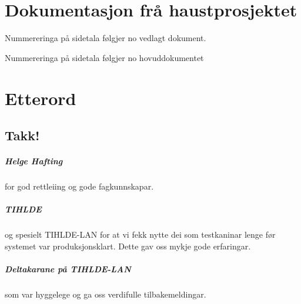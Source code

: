 \documentclass[nynorsk,12pt,a4paper,oneside]{book}
\begin{document}
\chapter{Dokumentasjon frå haustprosjektet}
		Nummereringa på sidetala følgjer no vedlagt dokument.
	
	Nummereringa på sidetala følgjer no hovuddokumentet

\backmatter
\chapter{Etterord}
\section{Takk!}
\paragraph{Helge Hafting} for god rettleiing og gode fagkunnskapar.
\paragraph{TIHLDE} og spesielt TIHLDE-LAN for at vi fekk nytte dei som testkaninar lenge før systemet var produksjonsklart. Dette gav oss mykje gode erfaringar.
\paragraph{Deltakarane på TIHLDE-LAN} som var hyggelege og ga oss verdifulle tilbakemeldingar.
\end{document}
